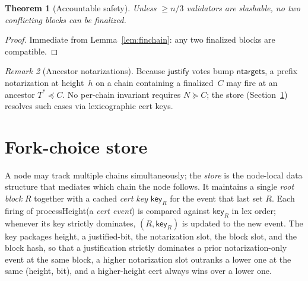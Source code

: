 \ifx\litemode\undefined\documentclass{article}\fi
\newcommand{\just}{\ensuremath{\mathsf{justify}}\xspace}
\newcommand{\ntargets}{\mathsf{ntargets}}
\newcommand{\key}{\mathsf{key}}
\newcommand{\processHeight}{\textsf{processHeight}\xspace}
\theoremstyle{plain}
\newtheorem{theorem}{Theorem}
\theoremstyle{definition}
\theoremstyle{remark}
\newtheorem{remark}[theorem]{Remark}
\begin{document}
\begin{theorem}[Accountable safety]\label{thm:safety}
Unless $\geq n/3$ validators are slashable, no two conflicting blocks can be finalized.
\end{theorem}

\begin{proof}
Immediate from Lemma~\ref{lem:finchain}: any two finalized blocks are compatible.
\end{proof}

\begin{remark}[Ancestor notarizations]\label{rem:notarization-safety}
Because \just votes bump $\ntargets$, a prefix notarization at height~$h$ on a chain containing a finalized~$C$ may fire at an ancestor $T^* \preceq C$.
No per-chain invariant requires $N \succeq C$; the store (Section~\ref{sec:store}) resolves such cases via lexicographic cert keys.
\end{remark}

\section{Fork-choice store}\label{sec:store}

A node may track multiple chains simultaneously; the \emph{store} is the node-local data structure that mediates which chain the node follows.
It maintains a single \emph{root block} $R$ together with a cached \emph{cert key} $\key_R$ for the event that last set $R$.
Each firing of \processHeight (a \emph{cert event}) is compared against $\key_R$ in lex order; whenever its key strictly dominates, $(R, \key_R)$ is updated to the new event.
The key packages height, a justified-bit, the notarization slot, the block slot, and the block hash, so that a justification strictly dominates a prior notarization-only event at the same block, a higher notarization slot outranks a lower one at the same (height, bit), and a higher-height cert always wins over a lower one.
\end{document}
